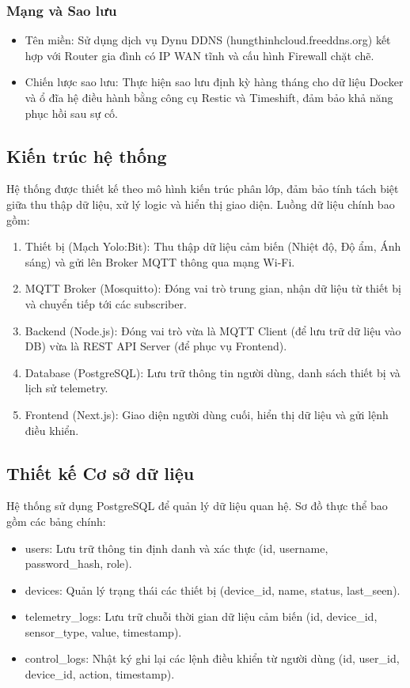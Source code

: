 \subsubsection{Mạng và Sao lưu}
\begin{itemize}
    \item Tên miền: Sử dụng dịch vụ Dynu DDNS (hungthinhcloud.freeddns.org) kết hợp với Router gia đình có IP WAN tĩnh và cấu hình Firewall chặt chẽ.
    \item Chiến lược sao lưu: Thực hiện sao lưu định kỳ hàng tháng cho dữ liệu Docker và ổ đĩa hệ điều hành bằng công cụ Restic và Timeshift, đảm bảo khả năng phục hồi sau sự cố.
\end{itemize}

\subsection{Kiến trúc hệ thống}
Hệ thống được thiết kế theo mô hình kiến trúc phân lớp, đảm bảo tính tách biệt giữa thu thập dữ liệu, xử lý logic và hiển thị giao diện. Luồng dữ liệu chính bao gồm:
\begin{enumerate}
    \item Thiết bị (Mạch Yolo:Bit): Thu thập dữ liệu cảm biến (Nhiệt độ, Độ ẩm, Ánh sáng) và gửi lên Broker MQTT thông qua mạng Wi-Fi.
    \item MQTT Broker (Mosquitto): Đóng vai trò trung gian, nhận dữ liệu từ thiết bị và chuyển tiếp tới các subscriber.
    \item Backend (Node.js): Đóng vai trò vừa là MQTT Client (để lưu trữ dữ liệu vào DB) vừa là REST API Server (để phục vụ Frontend).
    \item Database (PostgreSQL): Lưu trữ thông tin người dùng, danh sách thiết bị và lịch sử telemetry.
    \item Frontend (Next.js): Giao diện người dùng cuối, hiển thị dữ liệu và gửi lệnh điều khiển.
\end{enumerate}

\subsection{Thiết kế Cơ sở dữ liệu}
Hệ thống sử dụng PostgreSQL để quản lý dữ liệu quan hệ. Sơ đồ thực thể bao gồm các bảng chính:
\begin{itemize}
    \item users: Lưu trữ thông tin định danh và xác thực (id, username, password\_hash, role).
    \item devices: Quản lý trạng thái các thiết bị (device\_id, name, status, last\_seen).
    \item telemetry\_logs: Lưu trữ chuỗi thời gian dữ liệu cảm biến (id, device\_id, sensor\_type, value, timestamp).
    \item control\_logs: Nhật ký ghi lại các lệnh điều khiển từ người dùng (id, user\_id, device\_id, action, timestamp).
\end{itemize}

